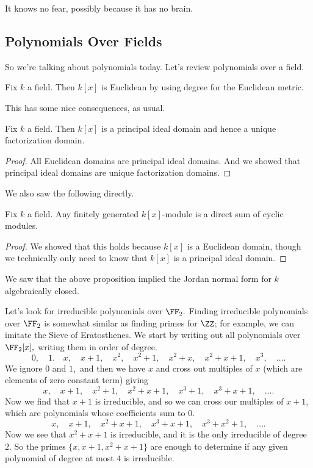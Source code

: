 % 


















It knows no fear, possibly because it has no brain.

\subsection{Polynomials Over Fields}
So we're talking about polynomials today. Let's review polynomials over a field.
\begin{theorem}
	Fix $k$ a field. Then $k[x]$ is Euclidean by using degree for the Euclidean metric.
\end{theorem}
This has some nice consequences, as usual.
\begin{proposition}
	Fix $k$ a field. Then $k[x]$ is a principal ideal domain and hence a unique factorization domain.
\end{proposition}
\begin{proof}
	All Euclidean domains are principal ideal domains. And we showed that principal ideal domains are unique factorization domains.
\end{proof}
We also saw the following directly.
\begin{proposition}
	Fix $k$ a field. Any finitely generated $k[x]$-module is a direct sum of cyclic modules.
\end{proposition}
\begin{proof}
	We showed that this holds because $k[x]$ is a Euclidean domain, though we technically only need to know that $k[x]$ is a principal ideal domain.
\end{proof}
We saw that the above proposition implied the Jordan normal form for $k$ algebraically closed.
\begin{example}
	Let's look for irreducible polynomials over $\FF_2.$ Finding irreducible polynomials over $\FF_2$ is somewhat similar as finding primes for $\ZZ$; for example, we can imitate the Sieve of Eratosthenes. We start by writing out all polynomials over $\FF_2[x],$ writing them in order of degree.
	\[0,\quad1.\quad x,\quad x+1,\quad x^2,\quad x^2+1,\quad x^2+x,\quad x^2+x+1,\quad x^3,\quad\ldots.\]
	We ignore $0$ and $1,$ and then we have $\boxed{x}$ and cross out multiples of $x$ (which are elements of zero constant term) giving
	\[\boxed{x},\quad x+1,\quad x^2+1,\quad x^2+x+1,\quad x^3+1,\quad x^3+x+1,\quad\ldots.\]
	Now we find that $x+1$ is irreducible, and so we can cross our multiples of $x+1,$ which are polynomials whose coefficients sum to $0.$ 
	\[\boxed{x},\quad\boxed{x+1},\quad x^2+x+1,\quad x^3+x+1,\quad x^3+x^2+1,\quad\ldots.\]
	Now we see that $\boxed{x^2+x+1}$ is irreducible, and it is the only irreducible of degree $2.$ So the primes $\{x,x+1,x^2+x+1\}$ are enough to determine if any given polynomial of degree at most $4$ is irreducible.
\end{example}
